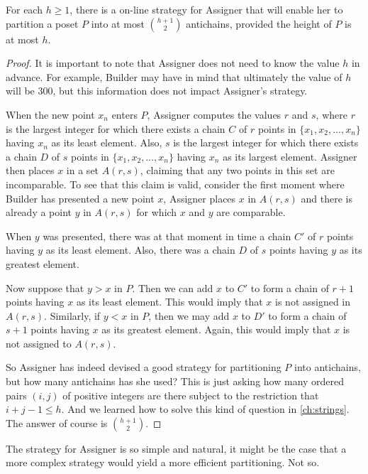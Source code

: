 \begin{theorem}
For each $h\ge1$, there is a on-line strategy for Assigner that will enable
her to partition a poset $P$ into at most $\binom{h+1}{2}$
antichains, provided the height of $P$ is at most $h$.
\end{theorem}
\begin{proof}
It is important to note that Assigner does not need to know the value
$h$ in advance.  For example, Builder may have in mind that ultimately
the value of $h$ will be $300$, but this information does not
impact Assigner's strategy.

When the new point $x_n$ enters $P$, Assigner computes the values
$r$ and $s$, where $r$ is the largest integer for which there
exists a chain $C$ of $r$ points in $\{x_1,x_2,\dots,x_n\}$ having
$x_n$ as its least element.  Also, $s$ is the largest integer for which there
exists a chain $D$ of $s$ points in $\{x_1,x_2,\dots,x_n\}$ having
$x_n$ as its largest element.  Assigner then places $x$ in a set
$A(r,s)$, claiming that any two points in this set are incomparable.
To see that this claim is valid, consider the first moment where
Builder has presented a new point $x$, Assigner places $x$ in 
$A(r,s)$ and there is already a point $y$ in $A(r,s)$ for which
$x$ and $y$ are comparable.

When $y$ was presented, there was at that moment in time a chain $C'$ of $r$ 
points having $y$ as its least element.  Also, there was a chain
$D$ of $s$ points having $y$ as its greatest element.  

Now suppose that $y>x$ in $P$.  Then we can add $x$ to $C'$ to
form a chain of $r+1$ points having $x$ as its least element.
This would imply that $x$ is not assigned in $A(r,s)$.  Similarly,
if $y<x$ in $P$,  then we may add $x$ to $D'$ to form a chain
of $s+1$ points having $x$ as its greatest element.  Again, this
would imply that $x$ is not assigned to $A(r,s)$.

So Assigner has indeed devised a good strategy for partitioning
$P$ into antichains, but how many antichains has she used?  
This is just asking how many ordered pairs $(i,j)$ of positive integers
are there subject to the restriction that $i+j-1\le h$.  And we
learned how to solve this kind of question in \autoref{ch:strings}.
The answer of course is $\binom{h+1}{2}$.
\end{proof}

The strategy for Assigner is so simple and natural, it might be
the case that a more complex strategy would yield a more efficient
partitioning.   Not so.

